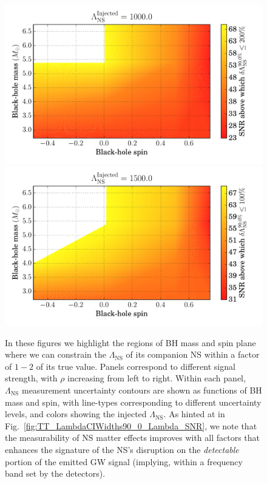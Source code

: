 \documentclass[aps,prd,amsmath,floats,floatfix, twocolumn,
superscriptaddress,nofootinbib,showpacs]{revtex4-1}
\newcommand{\lambdans}{\Lambda_\mathrm{NS}}
\begin{document}
\begin{figure}
\centering    
\includegraphics[width=1.025\columnwidth]{plots/TTSNRThresholdFor200LambdaMeasurement_BHspin_BHmass_Lambda1000_0_CI90_0}
\includegraphics[width=1.025\columnwidth]{plots/TTSNRThresholdFor100LambdaMeasurement_BHspin_BHmass_Lambda1500_0_CI90_0}
\caption{In these figures we highlight the regions of BH mass and spin plane where we can 
constrain the $\lambdans$ of its companion NS within a factor of $1-2$ of its true value.
Panels correspond to different signal strength, with $\rho$ increasing from left to right.
Within each panel, $\lambdans$ measurement uncertainty contours are shown as functions of BH 
mass and spin, with line-types corresponding to different uncertainty levels, and
colors showing the injected $\lambdans$.
As hinted at in Fig.~\ref{fig:TT_LambdaCIWidths90_0_Lambda_SNR}, we note that the measurability
of NS matter
effects improves with all factors that enhances the signature of the NS's disruption on
the \textit{detectable} portion of the emitted GW signal (implying, within a frequency band
set by the detectors).
}
\label{fig:TT_SNRThresholds_BHspin_BHmass_CI90_0}
\end{figure}
\end{document}
